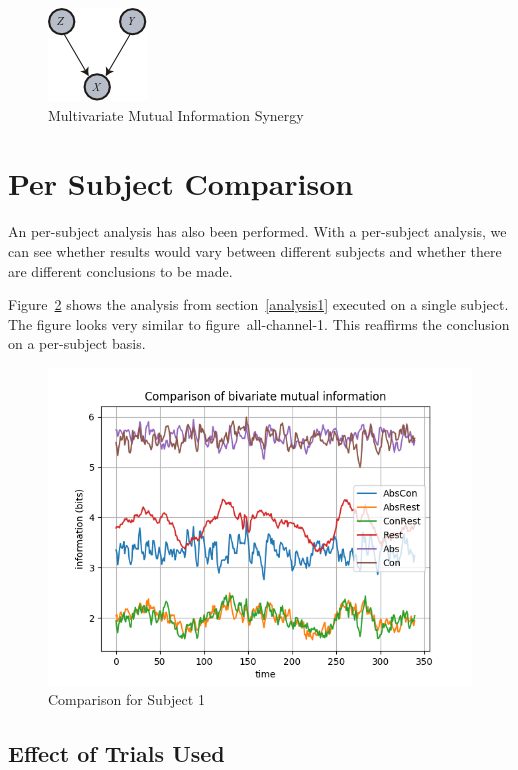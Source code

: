 \begin{figure}[H]
\caption{Multivariate Mutual Information Synergy}
\label{common}
    \centering
    \includegraphics[]{fig/common}
\end{figure}
    

\section{Per Subject Comparison}

An per-subject analysis has also been performed. With a per-subject analysis, we can see whether results would vary between different subjects and whether there are different conclusions to be made.

Figure~\ref{all-trials} shows the analysis from section~\ref{analysis1} executed on a single subject. The figure looks very similar to figure~{all-channel-1}. This reaffirms the conclusion on a per-subject basis.

\begin{figure}[!htb]
\caption{Comparison for Subject 1}
\label{all-trials}
    \centering
    \includegraphics[width=\textwidth]{fig/subject1_alltrials_all-channel-1}
\end{figure}

\subsection{Effect of Trials Used}

